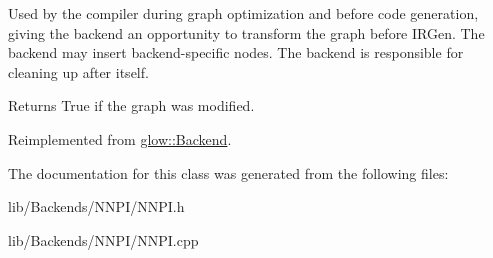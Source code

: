 Used by the compiler during graph optimization and before code generation, giving the backend an opportunity to transform the graph before I\+R\+Gen. The backend may insert backend-\/specific nodes. The backend is responsible for cleaning up after itself. \begin{DoxyReturn}{Returns}
True if the graph was modified. 
\end{DoxyReturn}


Reimplemented from \hyperlink{classglow_1_1_backend_a299652a58fc137b15c69858048980452}{glow\+::\+Backend}.



The documentation for this class was generated from the following files\+:\begin{DoxyCompactItemize}
\item 
lib/\+Backends/\+N\+N\+P\+I/N\+N\+P\+I.\+h\item 
lib/\+Backends/\+N\+N\+P\+I/N\+N\+P\+I.\+cpp\end{DoxyCompactItemize}
